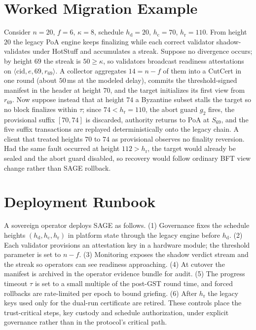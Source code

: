 \documentclass[journal]{IEEEtran}
\begin{document}
\section{Worked Migration Example}
\label{app:example}
Consider $n=20$, $f=6$, $\kappa=8$, schedule $h_{\mathrm{d}}=20$, $h_{\mathrm{c}}=70$,
$h_{\mathrm{r}}=110$. From height $20$ the legacy PoA engine keeps finalizing while each correct
validator shadow-validates under HotStuff and accumulates a streak. Suppose no divergence
occurs; by height $69$ the streak is $50\ge\kappa$, so validators broadcast readiness
attestations on $\langle\mathrm{cid},e,69,r_{69}\rangle$. A collector aggregates $14=n-f$ of them
into a CutCert in one round (about $50$\,ms at the modeled delay), commits the threshold-signed
manifest in the header at height $70$, and the target initializes its first view from $r_{69}$.
Now suppose instead that at height $74$ a Byzantine subset stalls the target so no block
finalizes within $\tau$; since $74<h_{\mathrm{r}}=110$, the abort guard $g_2$ fires, the
provisional suffix $[70,74]$ is discarded, authority returns to PoA at $S_{69}$, and the five
suffix transactions are replayed deterministically onto the legacy chain. A client that treated
heights $70$ to $74$ as provisional observes no finality reversion. Had the same fault occurred at
height $112>h_{\mathrm{r}}$, the target would already be sealed and the abort guard disabled, so
recovery would follow ordinary BFT view change rather than SAGE rollback.

\section{Deployment Runbook}
\label{app:runbook}
A sovereign operator deploys SAGE as follows. (1) Governance fixes the schedule heights
$(h_{\mathrm{d}},h_{\mathrm{c}},h_{\mathrm{r}})$ in platform state through the legacy engine
before $h_{\mathrm{d}}$. (2) Each validator provisions an attestation key in a hardware module;
the threshold parameter is set to $n-f$. (3) Monitoring exposes the shadow verdict stream and
the streak so operators can see readiness approaching. (4) At cutover the manifest is archived in
the operator evidence bundle for audit. (5) The progress timeout $\tau$ is set to a small
multiple of the post-GST round time, and forced rollbacks are rate-limited per epoch to bound
griefing. (6) After $h_{\mathrm{r}}$ the legacy keys used only for the dual-run certificate are
retired. These controls place the trust-critical steps, key custody and schedule authorization,
under explicit governance rather than in the protocol's critical path.
\end{document}
